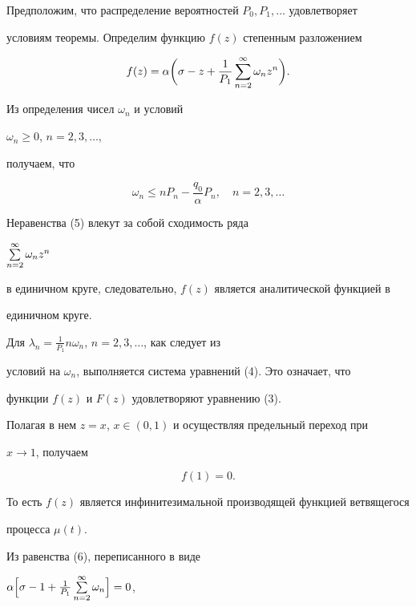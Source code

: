 Предположим, что распределение вероятностей $P_0, P_1, \dotsc $ удовлетворяет


условиям теоремы. Определим функцию $f(z)$ степенным разложением


$$


f(z)=\alpha \bigg(\sigma -z+\frac 1{P_1}\Su {n=2}^{\infty }


\omega_nz^n\biggr).


$$


Из определения чисел $\omega_n$ и условий


$\omega_n\geq 0$, $n=2, 3, \dotsc $,


получаем, что


\begin{equation}


\omega_n\leq nP_n-\frac {q_0}{\alpha }P_n,\quad


n=2, 3, \dotsc 


\end{equation}


Неравенства (5) влекут за собой сходимость ряда


$\sum \limits_ {n=2}^{\infty }\omega_nz^n$


в единичном круге, следовательно, $f(z)$ является аналитической функцией в


единичном круге.





Для $\lambda_n=\frac 1{P_1}n\omega_n$, $n=2, 3, \dotsc $, как следует из


условий на $\omega_n$, выполняется система уравнений (4). Это означает, что


функции $f(z)$ и $F(z)$ удовлетворяют уравнению (3).


Полагая в нем $z=x$, $x\in (0, 1)$ и осуществляя предельный переход при


$x\to 1$, получаем


\begin{equation}


f(1)=0.


\end{equation}


То есть $f(z)$ является инфинитезимальной производящей функцией ветвящегося


процесса $\mu (t)$.


Из равенства (6), переписанного в виде


$\alpha \Big[\sigma -1+\frac 1{P_1}\Su {n=2}^


{\infty }\omega_n\Big]=0$,


